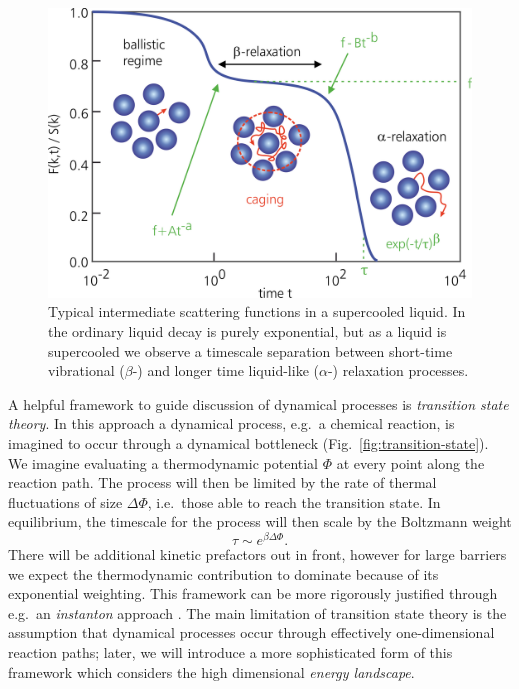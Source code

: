 \documentclass[11pt,twoside]{report}
\begin{document}
\begin{figure}
  \includegraphics[width=0.9\linewidth,outer]{isf}
  \caption[Intermediate scattering function in a supercooled liquid]{
    Typical intermediate scattering functions in a supercooled liquid.
    In the ordinary liquid decay is purely exponential, but as a liquid is supercooled we observe a timescale separation between short-time vibrational ($\beta$-) and longer time liquid-like ($\alpha$-) relaxation processes.
  }
  \label{fig:isf}
\end{figure}

A helpful framework to guide discussion of dynamical processes is \emph{transition state theory}.
In this approach a dynamical process, e.g.\ a chemical reaction, is imagined to occur through a dynamical bottleneck (Fig.\ \ref{fig:transition-state}).
We imagine evaluating a thermodynamic potential%
$\Phi$ at every point along the reaction path.
The process will then be limited by the rate of thermal fluctuations of size $\Delta \Phi$, i.e.\ those able to reach the transition state.
In equilibrium, the timescale for the process will then scale by the Boltzmann weight
\begin{equation}\label{eq:reaction-time}
  \tau \sim e^{\beta \Delta \Phi}.
\end{equation}
There will be additional kinetic prefactors out in front, however for large barriers we expect the thermodynamic contribution to dominate because of its exponential weighting.
This framework can be more rigorously justified through e.g.\ an \emph{instanton} approach \cite{LangerAP1969}.
The main limitation of transition state theory is the assumption that dynamical processes occur through effectively one-dimensional reaction paths; later, we will introduce a more sophisticated form of this framework which considers the high dimensional \emph{energy landscape}.
\end{document}
